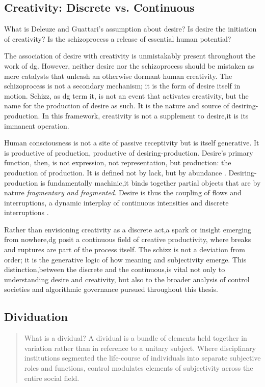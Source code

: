 \subsection{Creativity: Discrete vs. Continuous}

\begin{orangebox}
	What is Deleuze and Guattari’s assumption about desire? Is desire the initiation of creativity? Is the schizoprocess a release of essential human potential?

	The association of desire with creativity is unmistakably present throughout the work of \gls{dg}. However, neither desire nor the schizoprocess should be mistaken as mere catalysts that unleash an otherwise dormant human creativity. The schizoprocess is not a secondary mechanism; it is the form of desire itself in motion. Schizz, as \gls{dg} term it, is not an event that activates creativity, but the name for the production of desire as such. It is the nature and source of desiring-production. In this framework, creativity is not a supplement to desire,it is its immanent operation.

	Human consciousness is not a site of passive receptivity but is itself generative. It is productive of production, productive of desiring-production. Desire's primary function, then, is not expression, not representation, but production: the production of production. It is defined not by lack, but by abundance \parencite[49]{buchanan2008e}. Desiring-production is fundamentally machinic,it binds together partial objects that are by nature \textit{fragmentary and fragmented}. Desire is thus the coupling of flows and interruptions, a dynamic interplay of continuous intensities and discrete interruptions \parencite[5]{deleuze1983}.

	Rather than envisioning creativity as a discrete act,a spark or insight emerging from nowhere,\gls{dg} posit a continuous field of creative productivity, where breaks and ruptures are part of the process itself. The schizz is not a deviation from order; it is the generative logic of how meaning and subjectivity emerge. This distinction,between the discrete and the continuous,is vital not only to understanding desire and creativity, but also to the broader analysis of control societies and algorithmic governance pursued throughout this thesis.
\end{orangebox}



\subsection{Dividuation}
\begin{quote}
	What is a dividual? A dividual is a bundle of elements held together in variation  rather than in reference to a unitary subject. Where disciplinary institutions  segmented the life-course of individuals into separate subjective roles and  functions, control modulates elements of subjectivity across the entire social field.
	\parencite[5]{mackenzie2021}
\end{quote}


